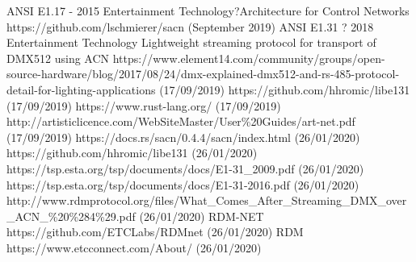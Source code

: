 \documentclass[11pt,a4paper,notitlepage]{report}
\begin{document}
	\begin{thebibliography}{9}
		ANSI E1.17 - 2015 Entertainment Technology?Architecture for Control Networks
		https://github.com/lschmierer/sacn (September 2019)
		ANSI E1.31 ? 2018 Entertainment Technology Lightweight streaming protocol for transport of DMX512 using ACN
		https://www.element14.com/community/groups/open-source-hardware/blog/2017/08/24/dmx-explained-dmx512-and-rs-485-protocol-detail-for-lighting-applications (17/09/2019)
		https://github.com/hhromic/libe131 (17/09/2019)
		https://www.rust-lang.org/ (17/09/2019)
		http://artisticlicence.com/WebSiteMaster/User\%20Guides/art-net.pdf (17/09/2019)
		https://docs.rs/sacn/0.4.4/sacn/index.html
		(26/01/2020)
		https://github.com/hhromic/libe131
		(26/01/2020)
		https://tsp.esta.org/tsp/documents/docs/E1-31\_2009.pdf
		(26/01/2020)
		https://tsp.esta.org/tsp/documents/docs/E1-31-2016.pdf
		(26/01/2020)
		http://www.rdmprotocol.org/files/What\_Comes\_After\_Streaming\_DMX\_over\_ACN\_\%20\%284\%29.pdf (26/01/2020)
		RDM-NET
		https://github.com/ETCLabs/RDMnet (26/01/2020)
		RDM
		https://www.etcconnect.com/About/ (26/01/2020)
		
	\end{thebibliography}
	
\end{document}
